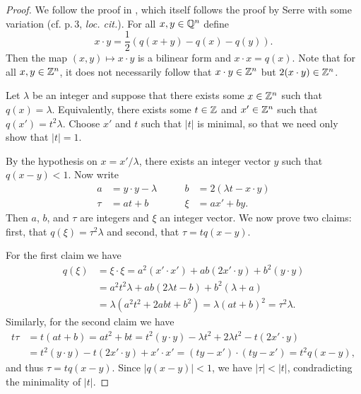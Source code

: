 \begin{proof}
    We follow the proof in \cite[p.\,2]{clark2011representation}, which itself
    follows the proof by Serre with some variation (cf. p.\,3, \emph{loc.
    cit.}). For all \(x, y \in \mathbb{Q}^n\) define
    \[
        x \cdot y = \frac{1}{2} \left( q(x + y) - q(x) - q(y) \right).
    \]
    Then the map \((x, y) \mapsto x \cdot y\) is a bilinear form and \(x \cdot x
    = q(x)\). Note that for all \(x, y \in \mathbb{Z}^n\), it does not
    necessarily follow that \(x \cdot y \in \mathbb{Z}^n\) but \(2(x \cdot y) \in
    \mathbb{Z}^n\).

    Let \(\lambda\) be an integer and suppose that there exists some \(x \in
    \mathbb{Z}^n\) such that \(q(x) = \lambda\). Equivalently, there exists some
    \(t \in \mathbb{Z}\) and \(x' \in \mathbb{Z}^n\) such that \(q(x') = t^2
    \lambda\). Choose \(x'\) and \(t\) such that \(|t|\) is minimal, so that we
    need only show that \(|t| = 1\).
    
    By the hypothesis on \(x = x'/\lambda\), there exists an integer vector
    \(y\) such that \(q(x - y) < 1\). Now write
    \begin{align*}
        a &= y \cdot y - \lambda \qquad &b &= 2(\lambda t - x \cdot y) \\
        \tau &= at + b\qquad &\xi &= ax' + by.
    \end{align*}
    Then \(a\), \(b\), and \(\tau\) are integers and \(\xi\) an integer vector.
    We now prove two claims: first, that \(q(\xi) = \tau^2\lambda\) and second,
    that \(\tau = tq(x - y)\).
    
    For the first claim we have
    \begin{align*}
        q(\xi) &= \xi \cdot \xi = a^2 (x' \cdot x') + ab(2x' \cdot y) + b^2(y \cdot y) \\
               &= a^2 t^2 \lambda + ab(2\lambda t - b) + b^2(\lambda + a) \\
               &= \lambda (a^2 t^2 + 2abt + b^2) = \lambda (at + b)^2 = \tau^2 \lambda.
    \end{align*}
    Similarly, for the second claim we have
    \begin{align*}
        t\tau &= t(at + b) = at^2 + bt = t^2 (y \cdot y) - \lambda t^2 + 2\lambda t^2 - t(2x' \cdot y)\\
        &= t^2(y \cdot y) - t(2x' \cdot y) + x' \cdot x' = (ty-x') \cdot (ty-x') = t^2 q(x - y),
    \end{align*}
    and thus \(\tau = tq(x - y)\). Since \(|q(x - y)| < 1\), we have \(|\tau| <
    |t|\), condradicting the minimality of \(|t|\).
\end{proof}


